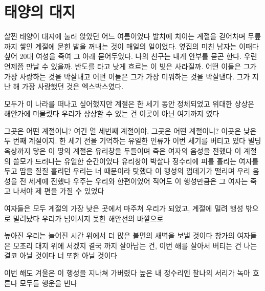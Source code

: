 \documentclass[12pt, b6paper, openany]{memoir}
\newenvironment{article}{}{}
\begin{document}
\begin{article}
\hypertarget{uxd0dcuxc591uxc758-uxb300uxc9c0}{%
\chapter{태양의 대지}\label{uxd0dcuxc591uxc758-uxb300uxc9c0}}

살찐 태양이 대지에 눌러 앉았던 어느 여름이었다 발치에 치이는 계절을 걷어차며 무릎까지 쌓인 계절에 묻힌 발을 꺼내는 것이 매일의 일이었다. 옆집의 미친 남자는 이때다 싶어 20대 여성을 죽여 그 아래 묻어두었다. 나의 친구는 내게 안부를 묻곤 한다. 우린 언제쯤 만날 수 있을까. 반도를 타고 낮게 흐르는 이 빛은 사라질까. 어떤 이들은 그가 가장 사랑하는 것을 박살내고 어떤 이들은 그가 가장 미워하는 것을 박살낸다. 그가 지난 해 가장 사랑했던 것은 엑스박스였다.

모두가 이 나라를 떠나고 싶어했지만 계절은 한 세기 동안 정체되었고 위대한 상상은 해안가에 머물렀다 우리가 상상할 수 있는 건 이곳이 아닌 여기까지 였다

그곳은 어떤 계절이니? 여긴 열 세번째 계절이야. 그곳은 어떤 계절이니? 이곳은 낮은 두 번째 계절이지. 한 세기 전을 기억하는 유일한 인류가 이번 세기를 버티고 있다 빌딩 옥상까지 닿은 이 땅의 계절은 유리창을 두들이며 죽은 여자의 음성을 전했다 이 계절의 쓸모가 드러나는 유일한 순간이었다 유리창이 박살나 정수리에 피를 흘리는 여자를 두고 땀을 질질 흘리던 우리는 너 때문이라 탓했다 이 행성의 껍데기가 떨리며 우리 음성을 전 세계에 전했다 우주는 우리와 한편이었어 적어도 이 행성만큼은 그 여자는 죽고 나서야 제 편을 가질 수 있었다

여자들은 모두 계절의 가장 낮은 곳에서 마주쳐 우리가 되었고, 계절에 밀려 행성 밖으로 밀려났다 우리가 넘어서지 못한 해안선의 바깥으로

높아진 우리는 늘어진 시간 위에서 더 많은 불면의 새벽을 보낼 것이다 창가의 여자들은 모조리 대지 위에 서겠지 결국 까지 살아남는 건, 이번 해를 살아서 버티는 건 나는 결코 아닐 것이다 너 또한 아닐 것이다

이번 해도 겨울은 이 행성을 지나쳐 가버렸다 높은 내 정수리엔 찰나의 서리가 녹아 흐른다 모두들 행운을 빈다
\end{article}
\end{document}
